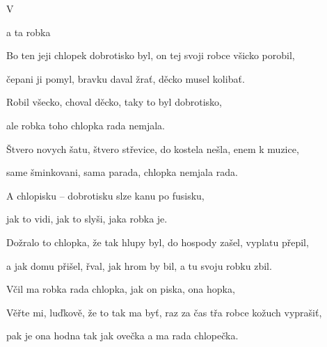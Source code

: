 

\zs
V    

a ta robka  

Bo ten jeji chlopek dobrotisko byl, on tej svoji robce všicko porobil,

čepani ji pomyl, bravku daval žrať, děcko musel kolibať.
\ks

\zs
Robil všecko, choval děcko, taky to byl dobrotisko,

ale robka toho chlopka rada nemjala.

Štvero novych šatu, štvero střevice, do kostela nešla, enem k muzice,

same šminkovani, sama parada, chlopka nemjala rada.
\ks

\zs
A chlopisku -- dobrotisku slze kanu po fusisku,

jak to vidi, jak to slyši, jaka robka je.

Dožralo to chlopka, že tak hlupy byl, do hospody zašel, vyplatu přepil,

a jak domu přišel, řval, jak hrom by bil, a tu svoju robku zbil.
\ks

\zs
Včil ma robka rada chlopka, jak on piska, ona hopka,


Věřte mi, luďkově, že to tak ma byť, raz za čas třa robce kožuch vyprašiť,

pak je ona hodna tak jak ovečka a ma rada chlopečka.
\ks

\kp
